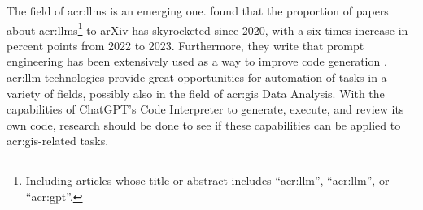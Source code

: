 The field of \glspl{acr:llm} is an emerging one. \cite[2]{fanLargeLanguageModels2023} found that the proportion of papers about \glspl{acr:llm}\footnote{Including articles whose title or abstract includes \enquote{\acrshort{acr:llm}}, \enquote{\acrlong{acr:llm}}, or \enquote{\acrshort{acr:gpt}}.} to arXiv has skyrocketed since 2020, with a six-times increase in percent points from 2022 to 2023. Furthermore, they write that prompt engineering has been extensively used as a way to improve code generation \citep[7]{fanLargeLanguageModels2023}. \gls{acr:llm} technologies provide great opportunities for automation of tasks in a variety of fields, possibly also in the field of \gls{acr:gis} Data Analysis. With the capabilities of ChatGPT's Code Interpreter to generate, execute, and review its own code, research should be done to see if these capabilities can be applied to \gls{acr:gis}-related tasks.

